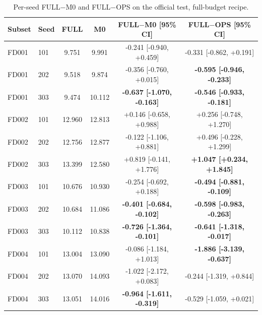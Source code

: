 \begin{table}[t]
\centering
\caption{Per-seed FULL$-$M0 and FULL$-$OPS on the official test, full-budget recipe.}
\label{tab:perseed}
\begin{tabular}{llcccc}
\toprule
Subset & Seed & FULL & M0 & FULL$-$M0 [95\% CI] & FULL$-$OPS [95\% CI] \\
\midrule
FD001 & 101 & 9.751 & 9.991 & -0.241 [-0.940, +0.459] & -0.331 [-0.862, +0.191] \\
FD001 & 202 & 9.518 & 9.874 & -0.356 [-0.760, +0.015] & \textbf{-0.595 [-0.946, -0.233]} \\
FD001 & 303 & 9.474 & 10.112 & \textbf{-0.637 [-1.070, -0.163]} & \textbf{-0.546 [-0.933, -0.181]} \\
\midrule
FD002 & 101 & 12.960 & 12.813 & +0.146 [-0.658, +0.988] & +0.256 [-0.748, +1.270] \\
FD002 & 202 & 12.756 & 12.877 & -0.122 [-1.106, +0.881] & +0.496 [-0.228, +1.299] \\
FD002 & 303 & 13.399 & 12.580 & +0.819 [-0.141, +1.776] & \textbf{+1.047 [+0.234, +1.845]} \\
\midrule
FD003 & 101 & 10.676 & 10.930 & -0.254 [-0.692, +0.188] & \textbf{-0.494 [-0.881, -0.109]} \\
FD003 & 202 & 10.684 & 11.086 & \textbf{-0.401 [-0.684, -0.102]} & \textbf{-0.598 [-0.983, -0.263]} \\
FD003 & 303 & 10.112 & 10.838 & \textbf{-0.726 [-1.364, -0.101]} & \textbf{-0.641 [-1.318, -0.017]} \\
\midrule
FD004 & 101 & 13.004 & 13.090 & -0.086 [-1.184, +1.013] & \textbf{-1.886 [-3.139, -0.637]} \\
FD004 & 202 & 13.070 & 14.093 & -1.022 [-2.172, +0.083] & -0.244 [-1.319, +0.844] \\
FD004 & 303 & 13.051 & 14.016 & \textbf{-0.964 [-1.611, -0.319]} & -0.529 [-1.059, +0.021] \\
\bottomrule
\end{tabular}
\end{table}

